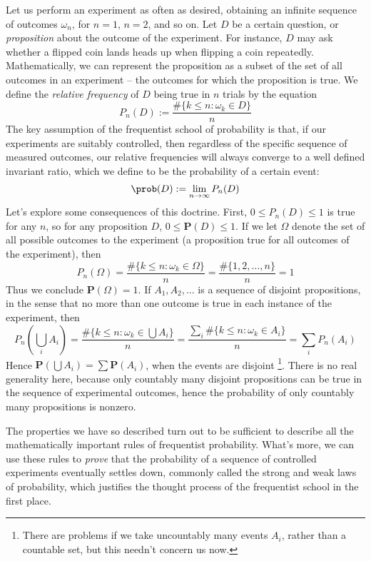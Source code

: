 Let us perform an experiment as often as desired, obtaining an infinite sequence of outcomes $\omega_n$, for $n = 1$, $n = 2$, and so on. Let $D$ be a certain question, or {\it proposition} about the outcome of the experiment. For instance, $D$ may ask whether a flipped coin lands heads up when flipping a coin repeatedly. Mathematically, we can represent the proposition as a subset of the set of all outcomes in an experiment -- the outcomes for which the proposition is true. We define the {\it relative frequency} of $D$ being true in $n$ trials by the equation
%
\[ P_n(D) := \frac{\# \{ k \leq n : \omega_k \in D \}}{n} \]
%
The key assumption of the frequentist school of probability is that, if our experiments are suitably controlled, then regardless of the specific sequence of measured outcomes, our relative frequencies will always converge to a well defined invariant ratio, which we define to be the probability of a certain event:
%
\[ \prob(D) := \lim_{n \to \infty} P_n(D) \]
%
Let's explore some consequences of this doctrine. First, $0 \leq P_n(D) \leq 1$ is true for any $n$, so for any proposition $D$, $0 \leq \mathbf{P}(D) \leq 1$. If we let $\Omega$ denote the set of all possible outcomes to the experiment (a proposition true for all outcomes of the experiment), then
%
\[ P_n(\Omega) = \frac{\# \{ k \leq n : \omega_k \in \Omega\}}{n} = \frac{\# \{ 1, 2, \dots, n \}}{n} = 1 \]
%
Thus we conclude $\mathbf{P}(\Omega) = 1$. If $A_1, A_2, \dots$ is a sequence of disjoint propositions, in the sense that no more than one outcome is true in each instance of the experiment, then
%
\[ P_n \left( \bigcup_i A_i \right) = \frac{\# \{ k \leq n : \omega_k \in \bigcup A_i \}}{n} = \frac{\sum_i \# \{ k \leq n : \omega_k \in A_i \}}{n} = \sum_i P_n(A_i) \]
%
Hence $\mathbf{P}( \bigcup A_i ) = \sum \mathbf{P}(A_i)$, when the events are disjoint \footnote{There are problems if we take uncountably many events $A_i$, rather than a countable set, but this needn't concern us now.}. There is no real generality here, because only countably many disjoint propositions can be true in the sequence of experimental outcomes, hence the probability of only countably many propositions is nonzero.

The properties we have so described turn out to be sufficient to describe all the mathematically important rules of frequentist probability. What's more, we can use these rules to {\it prove} that the probability of a sequence of controlled experiments eventually settles down, commonly called the strong and weak laws of probability, which justifies the thought process of the frequentist school in the first place.

